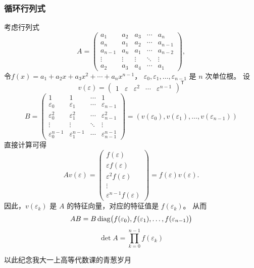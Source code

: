 \subsubsection{循环行列式}
考虑行列式
\[
    A =
    \begin{pmatrix}
        a_1 & a_2 & a_3 & \cdots & a_n \\
        a_n & a_1 & a_2 & \cdots & a_{n-1} \\
        a_{n-1} & a_n & a_1 & \cdots & a_{n-2} \\
        \vdots & \vdots & \vdots & \ddots & \vdots \\
        a_2 & a_3 & a_4 & \cdots & a_1
    \end{pmatrix},
\]
令\(f(x) = a_1 + a_2x + a_3x^2 + \cdots + a_nx^{n-1}\)，
\(\varepsilon_0, \varepsilon_1, \dots, \varepsilon_{n-1}\) 是 \(n\) 次单位根。
设
\[
    v(\varepsilon)
    =
    \begin{pmatrix}
        1 & \varepsilon & \varepsilon^2 & \cdots & \varepsilon^{n-1}
    \end{pmatrix}^{\mathsf{T}}
\]
\[
    B =
    \begin{pmatrix}
        1 & 1 & \cdots & 1 \\
        \varepsilon_0 & \varepsilon_1 & \cdots & \varepsilon_{n-1} \\
        \varepsilon_0^2 & \varepsilon_1^2 & \cdots & \varepsilon_{n-1}^2 \\
        \vdots & \vdots & \ddots & \vdots \\
        \varepsilon_0^{n-1} & \varepsilon_1^{n-1} & \cdots
        & \varepsilon_{n-1}^{n-1}
    \end{pmatrix} = (v(\varepsilon_0), v(\varepsilon_1), \dots, v(\varepsilon_{n-1}))
\]
直接计算可得
\[
    Av(\varepsilon)
    =
    \begin{pmatrix}
        f(\varepsilon) \\
        \varepsilon f(\varepsilon) \\
        \varepsilon^2 f(\varepsilon) \\
        \vdots \\
        \varepsilon^{n-1}f(\varepsilon)
    \end{pmatrix}
    = f(\varepsilon)v(\varepsilon).
\]
因此，\(v(\varepsilon_k)\) 是 \(A\) 的特征向量，对应的特征值是
\(f(\varepsilon_k)\)。
从而
\[
    AB = B\operatorname{diag}\bigl(f(\varepsilon_0),f(\varepsilon_1),\dots,
    f(\varepsilon_{n-1})\bigr)
\]
\[
    \det A = \prod_{k=0}^{n-1}f(\varepsilon_k)
\]

以此纪念我大一上高等代数课的青葱岁月
